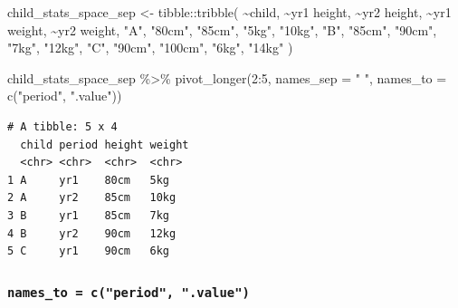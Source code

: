 \documentclass[
  letterpaper,
  DIV=11,
  numbers=noendperiod]{scrreprt}
\newenvironment{Shaded}{\begin{snugshade}}{\end{snugshade}}
\newcommand{\AttributeTok}[1]{\textcolor[rgb]{0.40,0.45,0.13}{#1}}
\newcommand{\DecValTok}[1]{\textcolor[rgb]{0.68,0.00,0.00}{#1}}
\newcommand{\FunctionTok}[1]{\textcolor[rgb]{0.28,0.35,0.67}{#1}}
\newcommand{\NormalTok}[1]{\textcolor[rgb]{0.00,0.23,0.31}{#1}}
\newcommand{\OtherTok}[1]{\textcolor[rgb]{0.00,0.23,0.31}{#1}}
\newcommand{\SpecialCharTok}[1]{\textcolor[rgb]{0.37,0.37,0.37}{#1}}
\newcommand{\StringTok}[1]{\textcolor[rgb]{0.13,0.47,0.30}{#1}}
\begin{document}
\begin{Shaded}
\begin{Highlighting}[]
\NormalTok{child\_stats\_space\_sep }\OtherTok{\textless{}{-}} 
\NormalTok{  tibble}\SpecialCharTok{::}\FunctionTok{tribble}\NormalTok{(}
    \SpecialCharTok{\textasciitilde{}}\NormalTok{child, }\SpecialCharTok{\textasciitilde{}}\StringTok{\textasciigrave{}}\AttributeTok{yr1 height}\StringTok{\textasciigrave{}}\NormalTok{, }\SpecialCharTok{\textasciitilde{}}\StringTok{\textasciigrave{}}\AttributeTok{yr2 height}\StringTok{\textasciigrave{}}\NormalTok{, }\SpecialCharTok{\textasciitilde{}}\StringTok{\textasciigrave{}}\AttributeTok{yr1 weight}\StringTok{\textasciigrave{}}\NormalTok{, }\SpecialCharTok{\textasciitilde{}}\StringTok{\textasciigrave{}}\AttributeTok{yr2 weight}\StringTok{\textasciigrave{}}\NormalTok{,}
       \StringTok{"A"}\NormalTok{,        }\StringTok{"80cm"}\NormalTok{,        }\StringTok{"85cm"}\NormalTok{,         }\StringTok{"5kg"}\NormalTok{,        }\StringTok{"10kg"}\NormalTok{,}
       \StringTok{"B"}\NormalTok{,        }\StringTok{"85cm"}\NormalTok{,        }\StringTok{"90cm"}\NormalTok{,         }\StringTok{"7kg"}\NormalTok{,        }\StringTok{"12kg"}\NormalTok{,}
       \StringTok{"C"}\NormalTok{,        }\StringTok{"90cm"}\NormalTok{,       }\StringTok{"100cm"}\NormalTok{,         }\StringTok{"6kg"}\NormalTok{,        }\StringTok{"14kg"}
\NormalTok{    )}

\NormalTok{child\_stats\_space\_sep }\SpecialCharTok{\%\textgreater{}\%} 
  \FunctionTok{pivot\_longer}\NormalTok{(}\DecValTok{2}\SpecialCharTok{:}\DecValTok{5}\NormalTok{, }
               \AttributeTok{names\_sep =} \StringTok{" "}\NormalTok{, }
               \AttributeTok{names\_to =} \FunctionTok{c}\NormalTok{(}\StringTok{"period"}\NormalTok{, }\StringTok{".value"}\NormalTok{))}
\end{Highlighting}
\end{Shaded}

\begin{verbatim}
# A tibble: 5 x 4
  child period height weight
  <chr> <chr>  <chr>  <chr> 
1 A     yr1    80cm   5kg   
2 A     yr2    85cm   10kg  
3 B     yr1    85cm   7kg   
4 B     yr2    90cm   12kg  
5 C     yr1    90cm   6kg   
\end{verbatim}

\hypertarget{names_to-cperiod-.value}{%
\subsubsection{\texorpdfstring{\texttt{names\_to\ =\ c("period",\ ".value")}}{names\_to = c("period", ".value")}}\label{names_to-cperiod-.value}}
\end{document}
